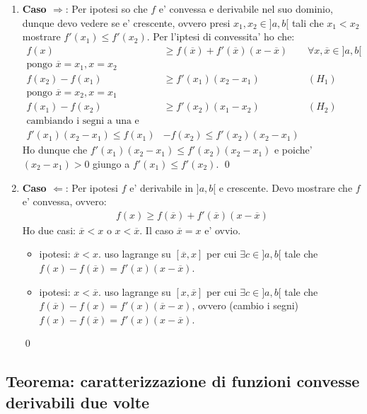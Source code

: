 \documentclass{article}
\begin{document}
\begin{enumerate}
  \item \textbf{Caso $\Rightarrow$}: Per ipotesi so che $f$ e' convessa e derivabile nel
  suo dominio, dunque devo vedere se e' crescente, ovvero presi $x_1, x_2 \in ]a,b[$
  tali che $x_1 < x_2$ mostrare $f'(x_1) \leq f'(x_2)$. Per l'iptesi di convessita' ho che:
  \begin{align*}
    f(x) &\geq f(\overline{x}) + f'(\overline{x}) (x-\overline{x}) & \forall x, \overline{x} \in ]a,b[ \\
    \text{pongo } \overline{x} = x_1, x = x_2 \\
    f(x_2) - f(x_1) &\geq  f'(x_1) (x_2-x_1) & (H_1) \\
    \text{pongo } \overline{x} = x_2, x = x_1 \\
    f(x_1) - f(x_2) &\geq  f'(x_2) (x_1-x_2) & (H_2) \\
    \text{cambiando i segni a una e unendo} \\
    f'(x_1)(x_2-x_1) \leq f(x_1) &- f(x_2) \leq f'(x_2) (x_2-x_1)
  \end{align*}
  Ho dunque che $f'(x_1)(x_2-x_1) \leq f'(x_2) (x_2-x_1)$ e poiche' $(x_2-x_1) > 0$
  giungo a $f'(x_1) \leq f'(x_2)$. \qed
  \item \textbf{Caso $\Leftarrow$}: Per ipotesi $f$ e' derivabile in $]a,b[$ e crescente.
    Devo mostrare che $f$ e' convessa, ovvero:
    \begin{align*}
      f(x) \geq f(\overline{x}) + f'(\overline{x}) (x-\overline{x})
    \end{align*}
    Ho due casi: $\overline{x} < x$ o $x < \overline{x}$. Il caso $\overline{x} = x$ e' ovvio.
    \begin{itemize}
      \item ipotesi: $\overline{x} < x$. uso lagrange su $[\overline{x}, x]$ per cui
        $\exists c \in ]a,b[$ tale che $f(x)-f(\overline{x})=f'(x)(x-\overline{x})$.
      \item ipotesi: $x < \overline{x}$. uso lagrange su $[x, \overline{x}]$ per cui
        $\exists c \in ]a,b[$ tale che $f(\overline{x})-f(x)=f'(x)(\overline{x}-x)$,
        ovvero (cambio i segni) $f(x)-f(\overline{x})=f'(x)(x-\overline{x})$.
    \end{itemize}
    \qed
\end{enumerate}

\subsection{Teorema: caratterizzazione di funzioni convesse derivabili due volte}
\end{document}
